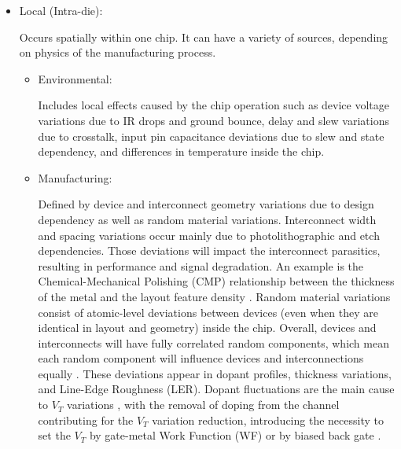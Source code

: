\documentclass[pgmicro,mestrado,english]{iiufrgs}
\begin{document}
\begin{itemize}
	\item Local (Intra-die):

	Occurs spatially within one chip. It can have a variety of sources, depending on physics of the manufacturing process.
		\begin{itemize}

		\item Environmental:

		Includes local effects caused by the chip operation such as device voltage variations due to IR drops and ground bounce, delay and slew variations due to crosstalk, input pin capacitance deviations due to slew and state dependency, and differences in temperature inside the chip. 

		\item Manufacturing:
		
Defined by device and interconnect geometry variations due to design dependency as well as random material variations. Interconnect width and spacing variations occur mainly due to photolithographic and etch dependencies. Those deviations will impact the interconnect parasitics, resulting in performance and signal degradation. An example is the Chemical-Mechanical Polishing (CMP) relationship between the thickness of the metal and the layout feature density \cite{stine1997analysis}.  Random material variations consist of atomic-level deviations between devices (even when they are identical in layout and geometry) inside the chip. Overall, devices and interconnects will have fully correlated random components, which mean each random component will influence devices and interconnections equally \cite{dietrich2011process}. These deviations appear in dopant profiles, thickness variations, and Line-Edge Roughness (LER). Dopant fluctuations are the main cause to $V_T$ variations \cite{asenov2003simulation}, with the removal of doping from the channel contributing for the $V_T$ variation reduction, introducing the necessity to set the $V_T$ by gate-metal Work Function (WF) or by biased back gate \cite{frank2001device,wong1999nanoscale}. 


\end{itemize}
\end{itemize}
\end{document}
